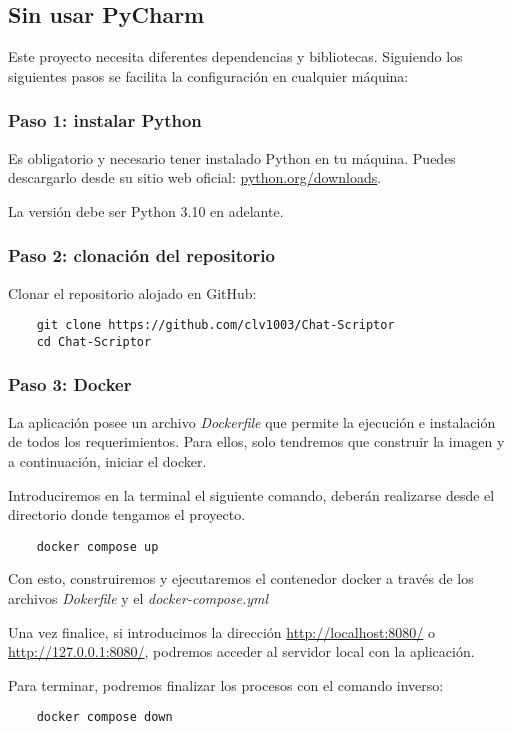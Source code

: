 \subsection{Sin usar PyCharm}
Este proyecto necesita diferentes dependencias y bibliotecas. Siguiendo los siguientes pasos se facilita la configuración en cualquier máquina:

\subsubsection{Paso 1: instalar Python}
Es obligatorio y necesario tener instalado Python en tu máquina. Puedes descargarlo desde su sitio web oficial: \url{python.org/downloads}.

La versión debe ser Python 3.10 en adelante.

\subsubsection{Paso 2: clonación del repositorio}
Clonar el repositorio alojado en GitHub:
\begin{verbatim}
    git clone https://github.com/clv1003/Chat-Scriptor
    cd Chat-Scriptor
\end{verbatim}

\subsubsection{Paso 3: Docker}
La aplicación posee un archivo \textit{Dockerfile} que permite la ejecución e instalación de todos los requerimientos. Para ellos, solo tendremos que construir la imagen y a continuación, iniciar el docker.

Introduciremos en la terminal el siguiente comando, deberán realizarse desde el directorio donde tengamos el proyecto.

\begin{verbatim}
    docker compose up
\end{verbatim}

Con esto, construiremos y ejecutaremos el contenedor docker a través de los archivos \textit{Dokerfile} y el \textit{docker-compose.yml}

Una vez finalice, si introducimos la dirección \url{http://localhost:8080/} o \url{http://127.0.0.1:8080/}, podremos acceder al servidor local con la aplicación.

Para terminar, podremos finalizar los procesos con el comando inverso:
\begin{verbatim}
    docker compose down
\end{verbatim}

